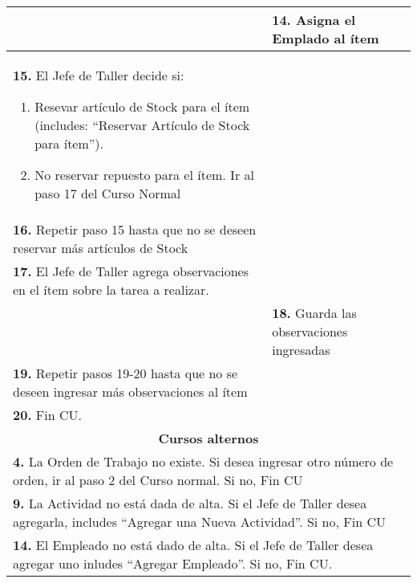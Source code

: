 \begin{longtable}{ |p{8cm}|p{8cm}| }
			\hline
			& \textbf{14. }Asigna el Emplado al ítem \\
			\hline
			\textbf{15. }El Jefe de Taller decide si:
			\begin{enumerate}[label=(\alph*)]
			 	\item Resevar artículo de Stock para el ítem (includes: ``Reservar Artículo de Stock para ítem'').
			 	\item No reservar repuesto para el ítem. Ir al paso 17 del Curso Normal
			\end{enumerate} & \\
			\hline
			\textbf{16. }Repetir paso 15 hasta que no se deseen reservar más artículos de Stock & \\
			\hline
			\textbf{17. }El Jefe de Taller agrega observaciones en el ítem sobre la tarea a realizar. & \\
			\hline
			& \textbf{18. }Guarda las observaciones ingresadas \\
			\hline
			\textbf{19. }Repetir pasos 19-20 hasta que no se deseen ingresar más observaciones al ítem & \\
			\hline
			\textbf{20. }Fin CU. & \\
		\hline
		\multicolumn{2}{|c|}{\textbf{Cursos alternos}}\\
		\hline
		\multicolumn{2}{|p{16cm}|}{\textbf{4. }La Orden de Trabajo no existe. Si desea ingresar otro número de orden, ir al paso 2 del Curso normal. Si no, Fin CU}\\
		\hline
		\multicolumn{2}{|p{16cm}|}{\textbf{9. }La Actividad no está dada de alta. Si el Jefe de Taller desea agregarla, includes ``Agregar una Nueva Actividad''. Si no, Fin CU}\\
		\hline
		\multicolumn{2}{|p{16cm}|}{\textbf{14. }El Empleado no está dado de alta. Si el Jefe de Taller desea agregar uno inludes ``Agregar Empleado''. Si no, Fin CU.}\\
		\hline	
	\end{longtable}


	
